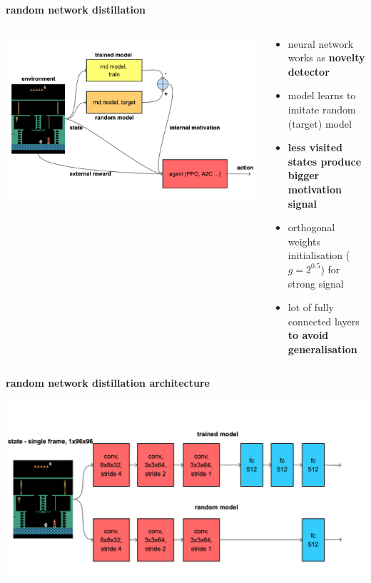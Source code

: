 \documentclass[xcolor=dvipsnames]{beamer}
\begin{document}
\begin{frame}{\bf random network distillation}

  \begin{columns}

    \begin{column}{0.5\textwidth}
      \includegraphics[scale=0.1]{../diagrams/rnd/rnd.png}
    \end{column}

    \begin{column}{0.5\textwidth}
      \begin{itemize}
        \item neural network works as {\bf novelty detector}
        \item model learns to imitate random (target) model
        \item {\bf less visited states produce bigger motivation signal}
        \item orthogonal weights initialisation ($g=2^{0.5}$) for strong signal
        \item lot of fully connected layers {\bf to avoid generalisation}
      \end{itemize}
    \end{column}


  \end{columns}

\end{frame}


\begin{frame}{\bf random network distillation architecture}

\centering
\includegraphics[scale=0.12]{../diagrams/rnd/modelrnd.png}

\end{frame}
\end{document}
